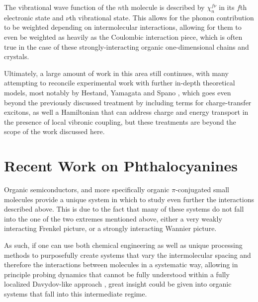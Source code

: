 The vibrational wave function of the $n$th molecule is described by $\chi_n^{f \nu}$ in its $f$th electronic state and $\nu$th vibrational state\cite{Hoffman2000}.  This allows for the phonon contribution to be weighted depending on intermolecular interactions, allowing for them to even be weighted as heavily as the Coulombic interaction piece, which is often true in the case of these strongly-interacting organic one-dimensional chains and crystals.   



Ultimately, a large amount of work in this area still continues, with many attempting to reconcile experimental work with further in-depth theoretical models,  most notably by Hestand, Yamagata and Spano \cite{Yamagata2014} \cite{Hestand20151} \cite{Hestand20152} \cite{Hestand20153}, which goes even beyond the previously discussed treatment by including terms for charge-transfer excitons, as well a Hamiltonian that can address charge and energy transport in the presence of local vibronic coupling, but these treatments are beyond the scope of the work discussed here.   





\section{Recent Work on Phthalocyanines}

  

Organic semiconductors, and more specifically organic $\pi$-conjugated small molecules provide a unique system in which to study even further the interactions described above.  This is due to the fact that many of these systems do not fall into the one of the two extremes mentioned above, either a very weakly interacting Frenkel picture, or a strongly interacting Wannier picture.



As such, if one can use both chemical engineering as well as unique processing methods to purposefully create systems that vary the intermolecular spacing and therefore the interactions between molecules in a systematic way, allowing in principle probing dynamics that cannot be fully understood within a fully localized Davydov-like approach\cite{Davydov1962} \cite{Hestand20152}, great insight could be given into organic systems that fall into this intermediate regime. 